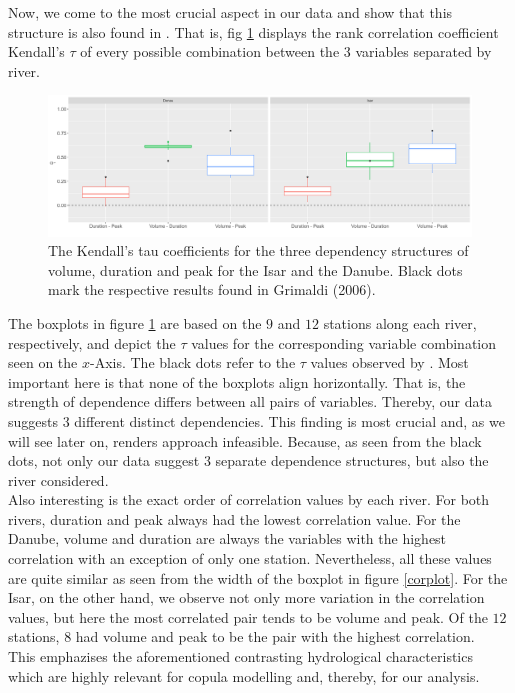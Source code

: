 \documentclass[
]{krantz}
\begin{document}
Now, we come to the most crucial aspect in our data and show that this structure is also found in \citet{grimaldi2006}. That is, fig \ref{fig:corplot} displays the rank correlation coefficient Kendall's \(\tau\)
of every possible combination between the \(3\) variables separated by river.

\begin{figure}

{\centering \includegraphics[width=1\linewidth]{work/04-floodfreq/figures/data_cor_plot} 

}

\caption{The Kendall's tau coefficients for the three dependency structures of volume, duration and peak for the Isar and the Danube. Black dots mark the respective results found in Grimaldi (2006).}\label{fig:corplot}
\end{figure}

The boxplots in figure \ref{fig:corplot}
are based on the \(9\) and \(12\) stations along each river, respectively, and
depict the \(\tau\) values for the corresponding variable combination seen on the \(x\)-Axis.
The black dots refer to the \(\tau\) values observed by \citet{grimaldi2006}.
Most important here is that none of the boxplots align horizontally. That is, the strength of dependence
differs between all pairs of variables.
Thereby, our data suggests \(3\) different distinct dependencies.
This finding is most crucial and, as we will see later on, renders \citet{grimaldi2006} approach infeasible. Because, as seen from the black dots, not only our data suggest \(3\) separate dependence structures, but also the river \citet{grimaldi2006} considered.\\
Also interesting is the exact order of correlation values by each river.
For both rivers, duration and peak always had the lowest correlation value.
For the Danube,
volume and duration are always the variables with the highest correlation with an exception of only one station.
Nevertheless, all these values are quite similar as seen from the width of the boxplot in figure \ref{corplot}.
For the Isar, on the other hand, we observe not only more variation in the correlation
values, but here the most correlated pair tends to be volume and peak. Of the \(12\) stations, \(8\)
had volume and peak to be the pair with the highest correlation.\\
This emphazises the aforementioned contrasting
hydrological characteristics which are highly relevant for copula modelling and, thereby, for our analysis.
\end{document}
